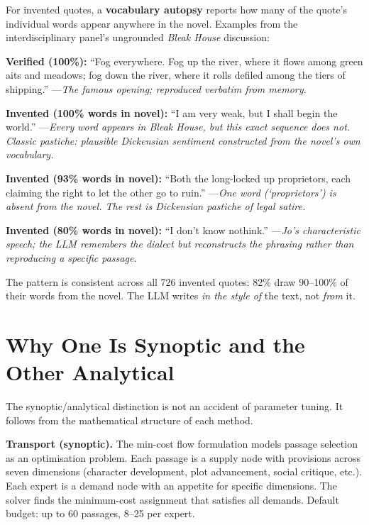 \documentclass[letterpaper]{article}
\begin{document}
For invented quotes, a \textbf{vocabulary autopsy} reports how many
of the quote's individual words appear anywhere in the novel.
Examples from the interdisciplinary panel's ungrounded \emph{Bleak
House} discussion:

\medskip\noindent
\textbf{Verified (100\%):} ``Fog everywhere.  Fog up the river,
where it flows among green aits and meadows; fog down the river,
where it rolls defiled among the tiers of shipping.''
---\emph{The famous opening; reproduced verbatim from memory.}

\medskip\noindent
\textbf{Invented (100\% words in novel):} ``I am very weak, but I
shall begin the world.''
---\emph{Every word appears in \emph{Bleak House}, but this exact
sequence does not.  Classic pastiche: plausible Dickensian sentiment
constructed from the novel's own vocabulary.}

\medskip\noindent
\textbf{Invented (93\% words in novel):} ``Both the long-locked up
proprietors, each claiming the right to let the other go to ruin.''
---\emph{One word (`proprietors') is absent from the novel.  The rest
is Dickensian pastiche of legal satire.}

\medskip\noindent
\textbf{Invented (80\% words in novel):} ``I don't know nothink.''
---\emph{Jo's characteristic speech; the LLM remembers the dialect but
reconstructs the phrasing rather than reproducing a specific passage.}

\medskip\noindent
The pattern is consistent across all 726 invented quotes: 82\% draw
90--100\% of their words from the novel.  The LLM writes \emph{in the
style of} the text, not \emph{from} it.

\section{Why One Is Synoptic and the Other Analytical}

The synoptic/analytical distinction is not an accident of parameter
tuning.  It follows from the mathematical structure of each method.

\textbf{Transport (synoptic).}  The min-cost flow formulation
\cite{ahuja1993network} models passage selection as an optimisation
problem.  Each passage is a supply node with provisions across seven
dimensions (character development, plot advancement, social critique,
etc.).  Each expert is a demand node with an appetite for specific
dimensions.  The solver finds the minimum-cost assignment that
satisfies all demands.  Default budget: up to 60 passages, 8--25 per
expert.
\end{document}
